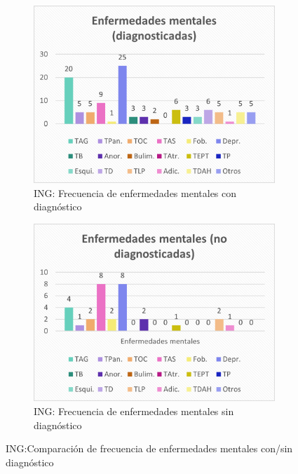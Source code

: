 \documentclass[12pt, a4paper,twoside,titlepage]{book}
\begin{document}
\begin{figure}
\centering
\begin{subfigure}{.5\textwidth}
  \centering
  \includegraphics[width=.95\linewidth]{ANEXO ING/23AnexINGEnfdiag}
  \caption{ING: Frecuencia de enfermedades mentales con diagnóstico}
\end{subfigure}%
\begin{subfigure}{.5\textwidth}
  \centering
  \includegraphics[width=.95\linewidth]{ANEXO ING/24AnexINGEnfnodiag}
  \caption{ING: Frecuencia de enfermedades mentales sin diagnóstico}
\end{subfigure}
\caption{ING:Comparación de frecuencia de enfermedades mentales con/sin diagnóstico}
  \label{fig:INGTenidasdiag}
\end{figure}
\end{document}
